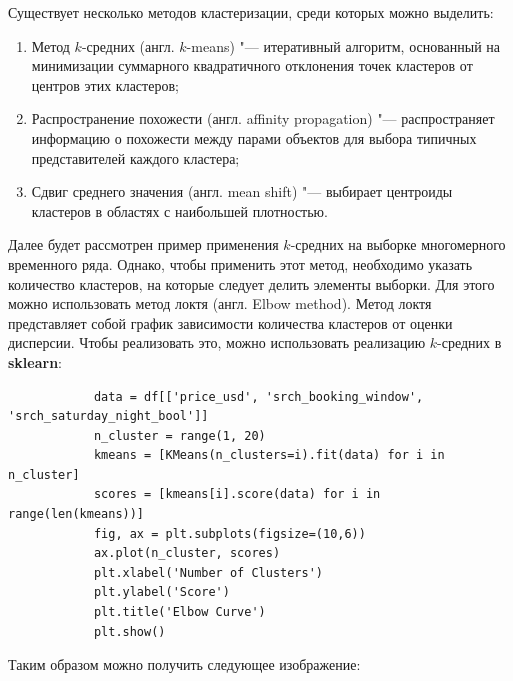 \documentclass[bachelor, och, referat]{../shiza}
\begin{document}
        Существует несколько методов кластеризации, среди которых можно
        выделить:

        \begin{enumerate}
            \item Метод $k$-средних (англ. $k$-means) "--- итеративный алгоритм,
            основанный на минимизации суммарного квадратичного отклонения точек
            кластеров от центров этих кластеров;
            \item Распространение похожести (англ. affinity propagation) "---
            распространяет информацию о похожести между парами объектов для
            выбора типичных представителей каждого кластера;
            \item Сдвиг среднего значения (англ. mean shift) "--- выбирает
            центроиды кластеров в областях с наибольшей плотностью.
        \end{enumerate}

        Далее будет рассмотрен пример применения $k$-средних на выборке
        многомерного временного ряда. Однако, чтобы применить этот метод,
        необходимо указать количество кластеров, на которые следует делить
        элементы выборки. Для этого можно использовать метод локтя (англ. Elbow
        method). Метод локтя представляет собой график зависимости количества
        кластеров от оценки дисперсии. Чтобы реализовать это, можно использовать
        реализацию $k$-средних в \textbf{sklearn}:

        \begin{verbatim}
            data = df[['price_usd', 'srch_booking_window', 'srch_saturday_night_bool']]
            n_cluster = range(1, 20)
            kmeans = [KMeans(n_clusters=i).fit(data) for i in n_cluster]
            scores = [kmeans[i].score(data) for i in range(len(kmeans))]
            fig, ax = plt.subplots(figsize=(10,6))
            ax.plot(n_cluster, scores)
            plt.xlabel('Number of Clusters')
            plt.ylabel('Score')
            plt.title('Elbow Curve')
            plt.show()
        \end{verbatim}

        Таким образом можно получить следующее изображение:
\end{document}
